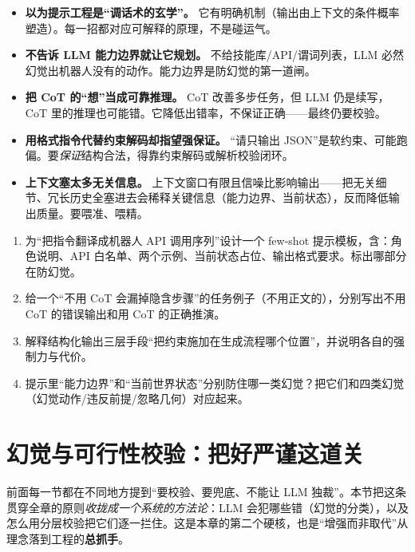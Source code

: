 \begin{pitfall}[本节常见陷阱]
\begin{itemize}
  \item \textbf{以为提示工程是“调话术的玄学”。} 它有明确机制（输出由上下文的条件概率塑造）。每一招都对应可解释的原理，不是碰运气。
  \item \textbf{不告诉 LLM 能力边界就让它规划。} 不给技能库/API/谓词列表，LLM 必然幻觉出机器人没有的动作。能力边界是防幻觉的第一道闸。
  \item \textbf{把 CoT 的“想”当成可靠推理。} CoT 改善多步任务，但 LLM 仍是续写，CoT 里的推理也可能错。它降低出错率，不保证正确——最终仍要校验。
  \item \textbf{用格式指令代替约束解码却指望强保证。} “请只输出 JSON”是软约束、可能跑偏。要\emph{保证}结构合法，得靠约束解码或解析校验闭环。
  \item \textbf{上下文塞太多无关信息。} 上下文窗口有限且信噪比影响输出——把无关细节、冗长历史全塞进去会稀释关键信息（能力边界、当前状态），反而降低输出质量。要喂准、喂精。
\end{itemize}
\end{pitfall}

\begin{exercise}
\begin{enumerate}
  \item 为“把指令翻译成机器人 API 调用序列”设计一个 few-shot 提示模板，含：角色说明、API 白名单、两个示例、当前状态占位、输出格式要求。标出哪部分在防幻觉。
  \item 给一个“不用 CoT 会漏掉隐含步骤”的任务例子（不用正文的），分别写出不用 CoT 的错误输出和用 CoT 的正确推演。
  \item 解释结构化输出三层手段“把约束施加在生成流程哪个位置”，并说明各自的强制力与代价。
  \item 提示里“能力边界”和“当前世界状态”分别防住哪一类幻觉？把它们和四类幻觉（幻觉动作/违反前提/忽略几何）对应起来。
\end{enumerate}
\end{exercise}

\section{幻觉与可行性校验：把好严谨这道关}
\label{sec:llm-verify}

前面每一节都在不同地方提到“要校验、要兜底、不能让 LLM 独裁”。本节把这条贯穿全章的原则\emph{收拢成一个系统的方法论}：LLM 会犯哪些错（幻觉的分类），以及怎么用分层校验把它们逐一拦住。这是本章的第二个硬核，也是“增强而非取代”从理念落到工程的\textbf{总抓手}。

